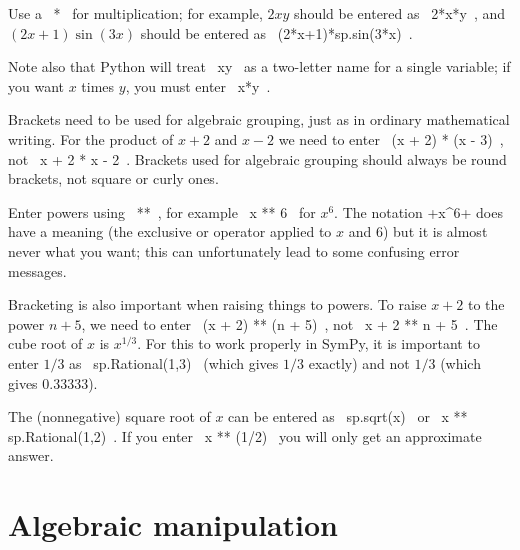\documentclass[a4paper,10pt]{amsbook}
\begin{document}
\begin{secenum}
 \item\label{star} Use a \pcode~*~ for multiplication; for example,
 $2xy$ should be entered as \pcode~2*x*y~, and $(2x+1)\sin(3x)$
 should be entered as \pcode~(2*x+1)*sp.sin(3*x)~. 
%
 \item\label{twoletters}
 Note also that Python will treat \pcode~xy~ as a two-letter
 name for a single variable; if you want $x$ times $y$, you
 must enter \pcode~x*y~. 
%
\item\label{timesbrackets} Brackets need to be used for algebraic
 grouping, just as in ordinary mathematical writing.  For the product
 of $x + 2$ and $x - 2$ we need to enter \pcode~(x + 2) * (x - 3)~,
 not \pcode~x + 2 * x - 2~.  Brackets used for algebraic grouping
 should always be round brackets, not square or curly ones.
%
 \item\label{powers} Enter powers using \pcode~**~,
 for example \pcode~x ** 6~ for $x^6$.  The notation \pcode+x^6+ does
 have a meaning (the exclusive or operator applied to $x$ and $6$) but
 it is almost never what you want; this can unfortunately lead to some
 confusing error messages.
%
\item\label{powerbrackets} Bracketing is also important when raising
 things to powers.  To raise $x + 2$ to the power $n+5$, we need to
 enter \pcode~(x + 2) ** (n + 5)~, not \pcode~x + 2 ** n + 5~.  The
 cube root of $x$ is $x^{1/3}$.  For this to work properly in SymPy,
 it is important to enter $1/3$ as \pcode~sp.Rational(1,3)~ (which
 gives $1/3$ exactly) and not $1/3$ (which gives 0.33333).
%
\item\label{sqrt} The (nonnegative) square root of $x$ can be entered
 as \pcode~sp.sqrt(x)~ or \pcode~x ** sp.Rational(1,2)~.  If you enter
 \pcode~x ** (1/2)~ you will only get an approximate answer.
\end{secenum}

\section{Algebraic manipulation}
\end{document}
